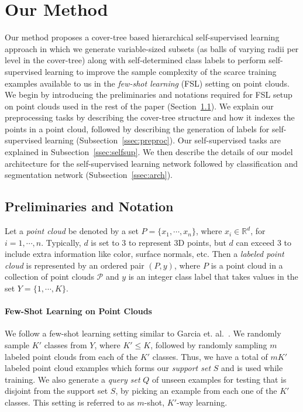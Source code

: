 \documentclass{article}
\begin{document}
\section{Our Method}
\label{ourmethod}
Our method proposes a cover-tree based hierarchical self-supervised learning approach in which we generate variable-sized subsets (as balls of varying radii per level in the cover-tree) along with self-determined class 
labels to perform self-supervised learning to improve the sample complexity of the scarce training examples available to us in the \emph{few-shot learning} (FSL) setting on point clouds. 
We begin by introducing the preliminaries and notations required for FSL setup on point clouds used in the rest of the paper (Section~\ref{subsec:prelim}). 
We explain our preprocessing tasks by describing the cover-tree structure and how it indexes the points in a point cloud, followed by describing the generation of labels for self-supervised learning (Subsection~\ref{ssec:preproc}). Our self-supervised tasks are explained in Subsection~\ref{ssec:selfsup}. We then describe the details of our model architecture for the self-supervised learning network followed by classification and 
segmentation network (Subsection~\ref{ssec:arch}).

\subsection{Preliminaries and Notation}
\label{subsec:prelim}

Let a \emph{point cloud} be denoted by a set $P=\{ x_1, \cdots, x_n \}$, where $x_i \in \mathds{R}^d$, for $i=1,\cdots,n$. 
Typically, $d$ is set to $3$ to represent $3$D points, but $d$ can exceed $3$ to include extra information like color, surface normals, etc. Then a \emph{labeled point cloud} is represented by an ordered pair $(P,y)$, where 
$P$ is a point cloud in a collection of point clouds $\mathscr{P}$ and $y$ is an integer class label that takes values in the set $Y= \{1, \cdots, K\}$. 
\paragraph{Few-Shot Learning on Point Clouds} 
We follow a few-shot learning setting similar to Garcia et. al.~\cite{garcia2018}. 
We randomly sample $K'$ classes from $Y$, where $K' \leq K$, followed by randomly sampling $m$ labeled point clouds from each of the $K'$ classes. Thus, we have a total of $mK'$ labeled point cloud examples which forms our \emph{support set} $S$ and is used while training. We also generate a \emph{query set} $Q$ of unseen examples for testing that is disjoint from the support set $S$, by picking an example from each one of the $K'$ classes. 
This setting is referred to as $m$-shot, $K'$-way learning. 
\end{document}

